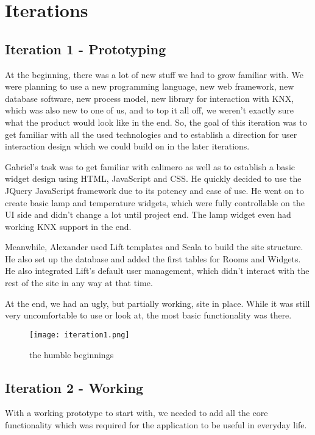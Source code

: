 \section{Iterations}
\subsection{Iteration 1 - Prototyping}
  At the beginning, there was a lot of new stuff we had to grow familiar with. We were planning to use a new programming language, new web framework, new database software, new process model, new library for interaction with KNX, which was also new to one of us, and to top it all off, we weren't exactly sure what the product would look like in the end. So, the goal of this iteration was to get familiar with all the used technologies and to establish a direction for user interaction design which we could build on in the later iterations.

  Gabriel's task was to get familiar with calimero as well as to establish a basic widget design using HTML, JavaScript and CSS. He quickly decided to use the JQuery JavaScript framework due to its potency and ease of use. He went on to create basic lamp and temperature widgets, which were fully controllable on the UI side and didn't change a lot until project end. The lamp widget even had working KNX support in the end.

  Meanwhile, Alexander used Lift templates and Scala to build the site structure. He also set up the database and added the first tables for Rooms and Widgets. He also integrated Lift's default user management, which didn't interact with the rest of the site in any way at that time.

  At the end, we had an ugly, but partially working, site in place. While it was still very uncomfortable to use or look at, the most basic functionality was there.
  \begin{figure}[h]
  \centering
  \texttt{[image: iteration1.png]}
  \caption{the humble beginnings}
  \label{fig:iterations1}
  \end{figure}


\clearpage
\subsection{Iteration 2 - Working}
  With a working prototype to start with, we needed to add all the core functionality which was required for the application to be useful in everyday life.

